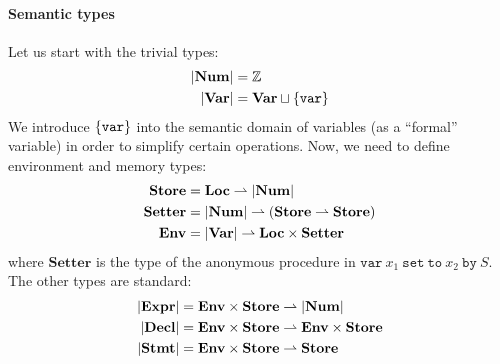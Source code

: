 \documentclass{../../psv}
\newcommand{\Num}{\mathbf{Num}}
\newcommand{\Var}{\mathbf{Var}}
\newcommand{\Expr}{\mathbf{Expr}}
\newcommand{\Decl}{\mathbf{Decl}}
\newcommand{\Stmt}{\mathbf{Stmt}}
\newcommand{\Store}{\mathbf{Store}}
\newcommand{\Setter}{\mathbf{Setter}}
\newcommand{\Env}{\mathbf{Env}}
\newcommand{\Loc}{\mathbf{Loc}}
\begin{document}
  \paragraph{Semantic types} Let us start with the trivial types:
  \begin{align*}
    \domain{\Num} &= \mathbb{Z}\\
    \domain{\Var} &= \Var \sqcup \set{\mathtt{var}}
  \end{align*}
  We introduce $\{\mathtt{var}\}$ into the semantic domain of variables (as a ``formal'' variable) in order to simplify certain operations. Now, we need to define environment and memory types:
  \begin{align*}
    \Store &= \Loc \pto \domain{\Num}\\
    \Setter &= \domain{\Num} \pto (\Store \pto \Store)\\
    \Env &= \domain{\Var} \pto \Loc \times \Setter
  \end{align*}
  where $\Setter$ is the type of the anonymous procedure in $\mathtt{var\ } x_1 \mathtt{\ set\ to\ } x_2 \mathtt{\ by\ } S$. The other types are standard:
  \begin{align*}
    \domain{\Expr} &= \Env \times \Store \pto \domain{\Num}\\
    \domain{\Decl} &= \Env \times \Store \pto \Env \times \Store\\
    \domain{\Stmt} &= \Env \times \Store \pto \Store
  \end{align*}
\end{document}
